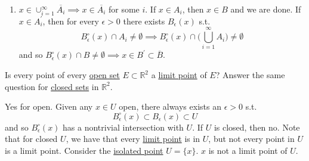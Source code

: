 \begin{solution}
\begin{enumerate}
        \item $x \in \cup_{i=1}^\infty \overline{A_i} \implies x \in \overline{A_i}$ for some $i$. If $x \in A_i$, then $x \in B$ and we are done. If $x \in A_i^\prime$, then for every $\epsilon > 0$ there exists $B_\epsilon (x) $ s.t. 
          \begin{equation}
            B_\epsilon^\circ (x) \cap A_i \neq \emptyset \implies B_\epsilon^\circ (x) \cap \bigg( \bigcup_{i=1}^\infty A_i \bigg) \neq \emptyset
          \end{equation}
          and so $B_\epsilon^\circ (x) \cap B \neq \emptyset \implies x \in B^\prime \subset \overline{B}$. 
    \end{enumerate}
  \end{solution}

  \begin{exercise}[Rudin 2.8]
    Is every point of every \hyperref[pst-def:open-set]{open set} $E \subset \mathbb{R}^2$ a \hyperref[pst-def:limit-point]{limit point} of $E$? Answer the same question for \hyperref[pst-def:closed]{closed sets} in $\mathbb{R}^2$. 
  \end{exercise}
  \begin{solution}
    Yes for open. Given any $x \in U$ open, there always exists an $\epsilon > 0$ s.t. 
    \begin{equation}
      B_\epsilon^\circ (x) \subset B_\epsilon (x) \subset U
    \end{equation}
    and so $B_\epsilon^\circ (x)$ has a nontrivial intersection with $U$. If $U$ is closed, then no. Note that for closed $U$, we have that every \hyperref[pst-def:limit-point]{limit point} is in $U$, but not every point in $U$ is a limit point. Consider the \hyperref[pst-def:isolated-point]{isolated point} $U = \{x\}$. $x$ is not a limit point of $U$. 
  \end{solution}

